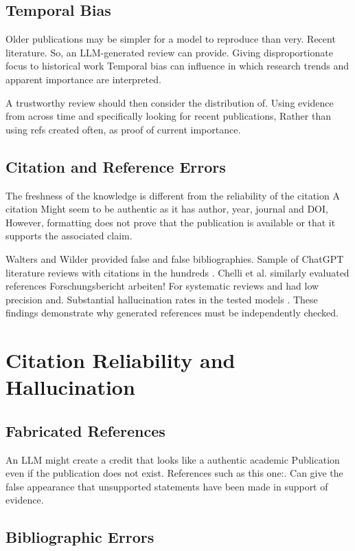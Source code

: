 \documentclass[acmsmall,screen]{acmart}
\begin{document}
\subsection{Temporal Bias}

Older publications may be simpler for a model to reproduce than very.
Recent literature. So, an LLM-generated review can provide.
Giving disproportionate focus to historical work Temporal bias can influence in which
research trends and apparent importance are interpreted.

A trustworthy review should then consider the distribution of.
Using evidence from across time and specifically looking for recent publications,
Rather than using refs created often, as proof of
current importance.

\subsection{Citation and Reference Errors}

The freshness of the knowledge is different from the reliability of the citation A citation
Might seem to be authentic as it has author, year, journal and DOI,
However, formatting does not prove that the publication is available or that
it supports the associated claim.

Walters and Wilder provided false and false bibliographies.
Sample of ChatGPT literature reviews with citations in the hundreds
\cite{walters2023}. Chelli et al. similarly evaluated references
Forschungsbericht arbeiten! For systematic reviews and had low precision and.
Substantial hallucination rates in the tested models
\cite{chelli2024}. These findings demonstrate why generated references
must be independently checked.

\section{Citation Reliability and Hallucination}

\subsection{Fabricated References}

An LLM might create a credit that looks like a authentic academic
Publication even if the publication does not exist. References such as this one:.
Can give the false appearance that unsupported statements have been made in support of evidence.

\subsection{Bibliographic Errors}
\end{document}
